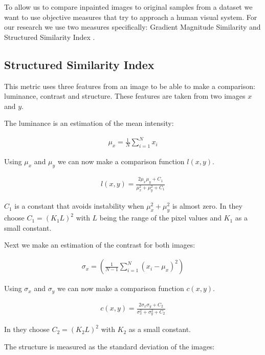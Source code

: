To allow us to compare inpainted images to original samples from a dataset we want to use objective measures that try to approach a human visual system. For our research we use two measures specifically: Gradient Magnitude Similarity \cite{xue_gradient_2014, zhang_gradient_2017} and Structured Similarity Index \cite{wang_image_2004}.

\subsection{Structured Similarity Index}

This metric uses three features from an image to be able to make a comparison: luminance, contrast and structure. These features are taken from two images $x$ and $y$.

The luminance is an estimation of the mean intensity:

\begin{align}
    \mu_x = \frac{1}{N}\sum_{i=1}^{N}{x_i}
\end{align}

Using $\mu_x$ and $\mu_y$ we can now make a comparison function $l(x, y)$.

\begin{align}
    l(x, y) = \frac{ 2\mu_x\mu_y + C_1 }{ \mu_x^2 + \mu_y^2 + C_1}
\end{align}

$C_1$ is a constant that avoids instability when $\mu_x^2 + \mu_y^2$ is almost zero. In \cite{wang_image_2004} they choose $C_1 = ( K_1 L )^2$ with $L$ being the range of the pixel values and $K_1$ as a small constant.

Next we make an estimation of the contrast for both images:

\begin{align}
    \sigma_x = \left( \frac{1}{N - 1} \sum_{i=1}^{N}{\left( x_i - \mu_x \right)^2} \right)
\end{align}

Using $\sigma_x$ and $\sigma_y$ we can now make a comparison function $c(x, y)$.

\begin{align}
    c(x, y) = \frac{ 2\sigma_x\sigma_y + C_2 }{ \sigma_x^2 + \sigma_y^2 + C_2}
\end{align}

In \cite{wang_image_2004} they choose $C_2 = ( K_2 L )^2$ with $K_2$ as a small constant.

The structure is measured as the standard deviation of the images:

